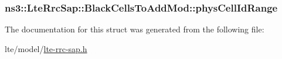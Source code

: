 \subsubsection[{\texorpdfstring{phys\+Cell\+Id\+Range}{physCellIdRange}}]{ ns3\+::\+Lte\+Rrc\+Sap\+::\+Black\+Cells\+To\+Add\+Mod\+::phys\+Cell\+Id\+Range}\hypertarget{structns3_1_1LteRrcSap_1_1BlackCellsToAddMod_aea531e9719e3f593411e2166567fe8bc}{}\label{structns3_1_1LteRrcSap_1_1BlackCellsToAddMod_aea531e9719e3f593411e2166567fe8bc}


The documentation for this struct was generated from the following file\+:\begin{DoxyCompactItemize}
\item 
lte/model/\hyperlink{lte-rrc-sap_8h}{lte-\/rrc-\/sap.\+h}\end{DoxyCompactItemize}
